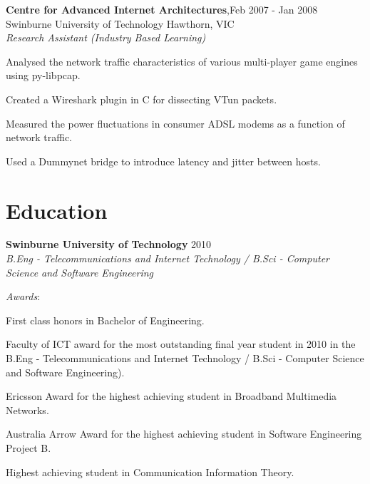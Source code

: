 \documentclass[line,margin]{res}
\begin{document}
\begin{resume}
        \textbf{Centre for Advanced Internet Architectures},\hfill Feb 2007 - Jan 2008 \\
        Swinburne University of Technology Hawthorn, VIC \\
        \textit{Research Assistant (Industry Based Learning)}\\

        \begin{list}{}{\leftmargin=1em \itemsep=-2pt}
            \item{Analysed the network traffic characteristics of various multi-player game engines using
            py-libpcap.}
            \item{Created a Wireshark plugin in C for dissecting VTun packets.}
            \item{Measured the power fluctuations in consumer ADSL modems as a function of network traffic.}
            \item{Used a Dummynet bridge to introduce latency and jitter between hosts.}
        \end{list}

        \section{Education}
        \textbf{Swinburne University of Technology} \hfill 2010\\
        \textit{B.Eng - Telecommunications and Internet Technology / B.Sci - Computer Science and
        Software Engineering}

        \textit{Awards}:
        \begin{list}{}{\leftmargin=1em \itemsep=-2pt}
            \item{First class honors in Bachelor of Engineering.}
            \item{Faculty of ICT award for the most outstanding final year student in 2010 in the B.Eng -
            Telecommunications and Internet Technology / B.Sci - Computer Science and Software
            Engineering).}
            \item{Ericsson Award for the highest achieving student in Broadband Multimedia Networks.}
            \item{Australia Arrow Award for the highest achieving student in Software Engineering Project B.}
            \item{Highest achieving student in Communication Information Theory.}
        \end{list}


\end{resume}
\end{document}
